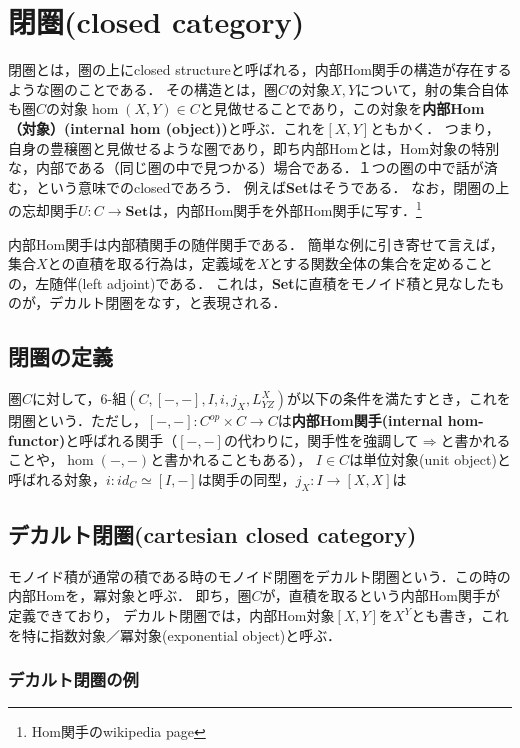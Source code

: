 \documentclass[uplatex, dvipdfmx]{jsreport}
\begin{document}
\chapter{閉圏(closed category)}
閉圏とは，圏の上にclosed structureと呼ばれる，内部Hom関手の構造が存在するような圏のことである．
その構造とは，圏$C$の対象$X,Y$について，射の集合自体も圏$C$の対象$\hom(X,Y)\in C$と見做せることであり，この対象を\textbf{内部Hom（対象）(internal hom (object))}と呼ぶ．これを$[X,Y]$ともかく．
つまり，自身の豊穣圏と見做せるような圏であり，即ち内部Homとは，Hom対象の特別な，内部である（同じ圏の中で見つかる）場合である．１つの圏の中で話が済む，という意味でのclosedであろう．
例えば\textbf{Set}はそうである．
なお，閉圏の上の忘却関手$U:C\to\mathbf{Set}$は，内部Hom関手を外部Hom関手に写す．\footnote{Hom関手のwikipedia page}

内部Hom関手は内部積関手の随伴関手である．
簡単な例に引き寄せて言えば，集合$X$との直積を取る行為は，定義域を$X$とする関数全体の集合を定めることの，左随伴(left adjoint)である．
これは，\textbf{Set}に直積をモノイド積と見なしたものが，デカルト閉圏をなす，と表現される．

\section{閉圏の定義}

\begin{definition}\label{def-closed-category} \rm{}
    圏$C$に対して，6-組$(C,[-,-],I,i,j_X,L^X_{YZ})$が以下の条件を満たすとき，これを閉圏という．ただし，$[-,-]:C^{op}\times C\to C$は\textbf{内部Hom関手(internal hom-functor)}と呼ばれる関手（$[-,-]$の代わりに，関手性を強調して$\Rightarrow$と書かれることや，$\hom (-,-)$と書かれることもある），
    $I\in C$は単位対象(unit object)と呼ばれる対象，$i:id_C\simeq [I,-]$は関手の同型，$j_X:I\to [X,X]$は
\end{definition}

\section{デカルト閉圏(cartesian closed category)}

モノイド積が通常の積である時のモノイド閉圏をデカルト閉圏という．この時の内部Homを，冪対象と呼ぶ．
即ち，圏$C$が，直積を取るという内部Hom関手が定義できており，
デカルト閉圏では，内部Hom対象$[X,Y]$を$X^Y$とも書き，これを特に指数対象／冪対象(exponential object)と呼ぶ．
\subsection{デカルト閉圏の例}
\end{document}
